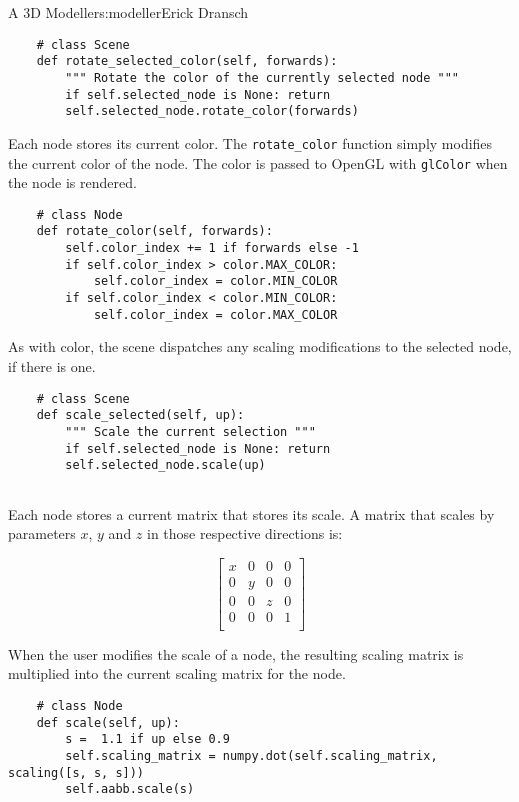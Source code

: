 \begin{aosachapter}{A 3D Modeller}{s:modeller}{Erick Dransch}
\begin{verbatim}
    # class Scene
    def rotate_selected_color(self, forwards):
        """ Rotate the color of the currently selected node """
        if self.selected_node is None: return
        self.selected_node.rotate_color(forwards)
\end{verbatim}

Each node stores its current color. The \texttt{rotate\_color} function
simply modifies the current color of the node. The color is passed to
OpenGL with \texttt{glColor} when the node is rendered.

\begin{verbatim}
    # class Node
    def rotate_color(self, forwards):
        self.color_index += 1 if forwards else -1
        if self.color_index > color.MAX_COLOR:
            self.color_index = color.MIN_COLOR
        if self.color_index < color.MIN_COLOR:
            self.color_index = color.MAX_COLOR
\end{verbatim}

\label{scaling-nodes}

As with color, the scene dispatches any scaling modifications to the
selected node, if there is one.

\begin{verbatim}
    # class Scene
    def scale_selected(self, up):
        """ Scale the current selection """
        if self.selected_node is None: return
        self.selected_node.scale(up)
    
\end{verbatim}

Each node stores a current matrix that stores its scale. A matrix that
scales by parameters $x$, $y$ and $z$ in those respective directions is:

\[
   \begin{bmatrix}
   x & 0 & 0 & 0 \\
   0 & y & 0 & 0 \\
   0 & 0 & z & 0 \\
   0 & 0 & 0 & 1 \\
   \end{bmatrix}
\]

When the user modifies the scale of a node, the resulting scaling matrix
is multiplied into the current scaling matrix for the node.

\begin{verbatim}
    # class Node
    def scale(self, up):
        s =  1.1 if up else 0.9
        self.scaling_matrix = numpy.dot(self.scaling_matrix, scaling([s, s, s]))
        self.aabb.scale(s)
\end{verbatim}


\end{aosachapter}
